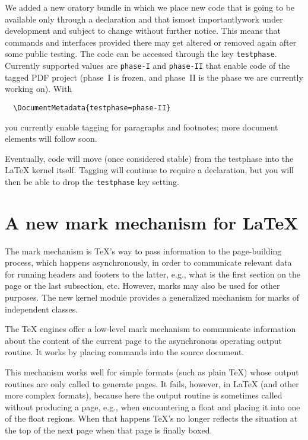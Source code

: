 \documentclass{ltnews}
\providecommand\Dash {\unskip \textemdash}
\begin{document}
We added a new oratory bundle in which we place new
code that is going to be available only through a
 declaration and that is\Dash most
importantly\Dash work under development and subject to
change without further notice. This means that commands and interfaces provided there may
get altered or removed again after some public testing.  The code can
be accessed through the  key \texttt{testphase}.
Currently supported values are \texttt{phase-I} and \texttt{phase-II}
that enable code of the tagged PDF project (phase~I is frozen, and
phase~II is the phase we are currently working on).  With
\begin{verbatim}
  \DocumentMetadata{testphase=phase-II}
\end{verbatim}
you currently enable tagging for paragraphs and footnotes; more
document elements will follow soon.

Eventually, code will move (once considered stable) from the
testphase into the \LaTeX{} kernel itself. Tagging will continue to
require a  declaration, but you will then be able
to drop the \texttt{testphase} key setting.


\section{A new mark mechanism for \LaTeX{}}

The mark mechanism is \TeX{}'s way to pass information to the
page-building process, which happens asynchronously, in order to
communicate relevant data for running headers and footers to the
latter, e.g., what is the first section on the page or the last
subsection, etc. However, marks may also be
used for other purposes. The new kernel module provides a generalized
mechanism for marks of independent classes.

The \TeX{} engines offer a low-level mark mechanism to
communicate information about the content of the current page to
the asynchronous operating output routine. It works by placing
 commands into the source document.

This mechanism works well for simple formats (such as plain \TeX)
whose output routines are only called to generate pages. It
fails, however, in \LaTeX{} (and other more complex formats),
because here the output routine is sometimes called without
producing a page, e.g., when encountering a float and placing it
into one of the float regions.
%
When that happens \TeX{}'s   no
longer reflects the situation at the top of the next page when that
page is finally boxed.
\end{document}
